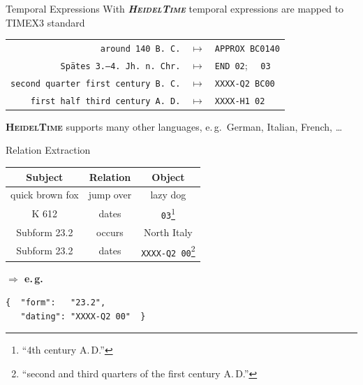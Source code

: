 \documentclass[xcolor=x11names, aspectratio=169,usenames,dvipsnames]{beamer}
\begin{document}
\begin{frame}{Temporal Expressions}
With \textbf{\textit{\textsc{HeidelTime}}} temporal expressions are mapped to TIMEX3 standard
\begin{center}
{\renewcommand{\arraystretch}{1.2}%
\begin{tabular}{rcl}
\texttt{around 140 B.\,C.}&$\longmapsto$&\texttt{APPROX BC0140}\\
\texttt{Spätes 3.–4.\ Jh.\ n.\,Chr.}&$\longmapsto$&\texttt{END 02};~~ \texttt{03}\\
\texttt{second quarter first century B.\,C.}&$\longmapsto$&\texttt{XXXX-Q2 BC00}\\
\texttt{first half third century A.\,D.}&$\longmapsto$&\texttt{XXXX-H1 02}\\
\end{tabular}
}
\end{center}

\textbf{\textsc{HeidelTime}} supports many other languages, e.\,g.\ German, Italian, French, \dots
\end{frame}

\begin{frame}[fragile]{Relation Extraction}
\begin{center}
\begin{tabularx}{\textwidth}{CCC}
\toprule
\textbf{Subject}&\textbf{Relation}&\textbf{Object}\\\midrule
quick brown fox&jump over&lazy dog\\
K 612&dates&\texttt{03}\footnote{\enquote{4th century A.\,D.}}\\
Subform 23.2&occurs&North Italy\\
Subform 23.2&dates&\texttt{XXXX-Q2 00}\footnote{\enquote{second and third quarters of the first century A.\,D.}}\\
\bottomrule
\end{tabularx}\bigskip\pause

\begin{minipage}{0.3\textwidth}\flushright
\textbf{$\boldsymbol{\Rightarrow}$ e.\,g.}
\end{minipage}\hfill
\begin{minipage}{0.65\textwidth}
{
\begin{verbatim}
{  "form":   "23.2",
   "dating": "XXXX-Q2 00"  }
\end{verbatim}
}
\end{minipage}
\end{center}
\end{frame}
\end{document}
